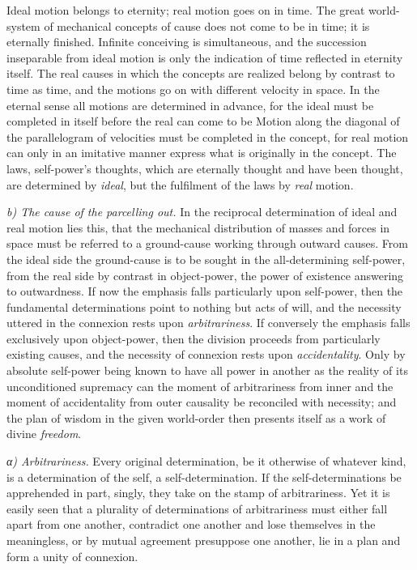 \documentclass[12pt,a4paper]{book}
\newcommand{\runin}[1]{\emph{#1}\hspace{0.4em}}
\newcommand{\subrunin}[1]{\emph{#1}\hspace{0.4em}}
\begin{document}
Ideal motion belongs to eternity; real motion goes on in time. The great world-system of mechanical
concepts of cause does not come to be in time; it is eternally finished. Infinite conceiving is
simultaneous, and the succession inseparable from ideal motion is only the indication of time
reflected in eternity itself. The real causes in which the concepts are realized belong by contrast
to time as time, and the motions go on with different velocity in space. In the eternal sense all
motions are determined in advance, for the ideal must be completed in itself before the real can
come to be
Motion along the diagonal of the parallelogram of velocities must be completed in the concept, for
real motion can only in an imitative manner express what is originally in the concept. The laws,
self-power's thoughts, which are eternally thought and have been thought, are determined by
\emph{ideal}, but the fulfilment of the laws by \emph{real} motion.

\runin{b) The cause of the parcelling out.} In the reciprocal determination of
ideal and real motion lies this, that the mechanical distribution of masses and forces in space
must be referred to a ground-cause working through outward causes. From the ideal side the
ground-cause is to be sought in the all-determining self-power, from the real side by contrast in
object-power, the power of existence answering to outwardness. If now the emphasis falls
particularly upon self-power, then the fundamental determinations point to nothing but acts of
will, and the necessity uttered in the connexion rests upon \emph{arbitrariness}. If conversely the
emphasis falls exclusively upon object-power, then the division proceeds from particularly existing
causes, and the necessity of connexion rests upon \emph{accidentality}. Only by absolute self-power
being known to have all power in another as the reality of its unconditioned supremacy can the
moment of arbitrariness from inner and the moment of accidentality from outer causality be
reconciled with necessity; and the plan of wisdom in the given world-order then presents itself as a
work of divine \emph{freedom}.

\subrunin{α) Arbitrariness.} Every original determination, be it otherwise of whatever kind, is a
determination of the self, a self-determination. If the self-determinations be apprehended in part,
singly, they take on the stamp of arbitrariness. Yet it is easily seen that a plurality of
determinations of arbitrariness must either fall apart from one another, contradict one another and
lose themselves in the meaningless, or by mutual agreement presuppose one another, lie in a plan and
form a unity of connexion.
\end{document}
